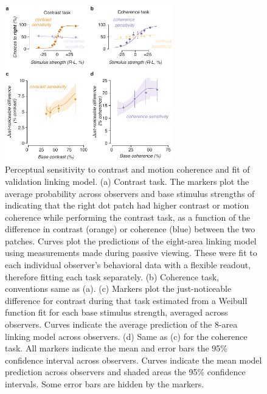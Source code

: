 \begin{figure}
\centering
\includegraphics[keepaspectratio,width=0.65\textwidth]{figs_c3/Fig2_behav.pdf}
\caption[Perceptual sensitivity to contrast and motion coherence and fit of validation linking model]{Perceptual sensitivity to contrast and motion coherence and fit of validation linking model. (a) Contrast task. The markers plot the average probability across observers and base stimulus strengths of indicating that the right dot patch had higher contrast or motion coherence while performing the contrast task, as a function of the difference in contrast (orange) or coherence (blue) between the two patches. Curves plot the predictions of the eight-area linking model using measurements made during passive viewing. These were fit to each individual observer’s behavioral data with a flexible readout, therefore fitting each task separately. (b) Coherence task, conventions same as (a). (c) Markers plot the just-noticeable difference for contrast during that task estimated from a Weibull function fit for each base stimulus strength, averaged across observers. Curves indicate the average prediction of the 8-area linking model across observers. (d) Same as (c) for the coherence task. All markers indicate the mean and error bars the 95\% confidence interval across observers. Curves indicate the mean model prediction across observers and shaded areas the 95\% confidence intervals. Some error bars are hidden by the markers.}
\label{fig:c3f2}
\end{figure}

